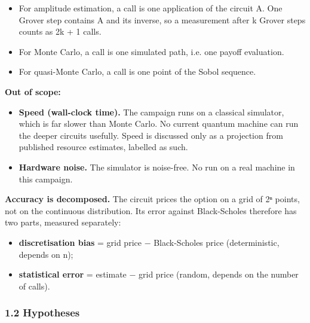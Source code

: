 \documentclass[
  10pt,
]{article}
\providecommand{\tightlist}{%
  \setlength{\itemsep}{0pt}\setlength{\parskip}{0pt}}
\begin{document}
\begin{itemize}
\tightlist
\item
  For amplitude estimation, a call is one application of the circuit A.
  One Grover step contains A and its inverse, so a measurement after k
  Grover steps counts as 2k + 1 calls.
\item
  For Monte Carlo, a call is one simulated path, i.e. one payoff
  evaluation.
\item
  For quasi-Monte Carlo, a call is one point of the Sobol sequence.
\end{itemize}

\textbf{Out of scope:}

\begin{itemize}
\tightlist
\item
  \textbf{Speed (wall-clock time).} The campaign runs on a classical
  simulator, which is far slower than Monte Carlo. No current quantum
  machine can run the deeper circuits usefully. Speed is discussed only
  as a projection from published resource estimates, labelled as such.
\item
  \textbf{Hardware noise.} The simulator is noise-free. No run on a real
  machine in this campaign.
\end{itemize}

\textbf{Accuracy is decomposed.} The circuit prices the option on a grid
of 2ⁿ points, not on the continuous distribution. Its error against
Black-Scholes therefore has two parts, measured separately:

\begin{itemize}
\tightlist
\item
  \textbf{discretisation bias} = grid price − Black-Scholes price
  (deterministic, depends on n);
\item
  \textbf{statistical error} = estimate − grid price (random, depends on
  the number of calls).
\end{itemize}

\hypertarget{12-hypotheses}{%
\subsubsection{1.2 Hypotheses}\label{12-hypotheses}}
\end{document}
